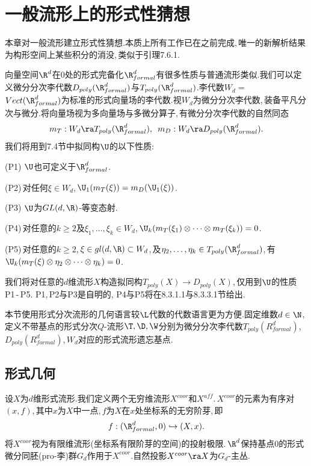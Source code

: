 \chapter{一般流形上的形式性猜想}

本章对一般流形建立形式性猜想.本质上所有工作已在之前完成,\,唯一的新解析结果为构形空间上某些积分的消没,\,类似于引理7.6.1.

向量空间$\R^d$在$0$处的形式完备化$\R^d_{formal}$有很多性质与普通流形类似.我们可以定义微分分次李代数$D_{poly}(\R^d_{formal})$与$T_{poly}(\R^d_{formal})$.李代数$W_d=$\\$Vect(\R^d_{formal})$为标准的形式向量场的李代数.视$W_d$为微分分次李代数,\,装备平凡分次与微分.将向量场视为多向量场与多微分算子,\,有微分分次李代数的自然同态
$$m_T: W_d\ra T_{poly}
               (\R^d_{formal}),\,\,\,m_D:W_d\ra D_{poly}
               (\R^d_{formal}).$$
我们将用到7.4节中拟同构$\U$的以下性质:\,

(P1)\,\,$\U$也可定义于$\R^d_{formal}$.

(P2)\,对任何$\xi\in W_d$,\,$\U_1(m_T(\xi))=m_D(\U_1(\xi))$.

(P3)\,\,$\U$为$GL(d,\R)$-等变态射.

(P4)\,对任意的$k\ge 2$及$\xi_1,\dots,\xi_k\in W_d$,\,$\U_k(m_T(\xi_1)\otimes\dots\otimes
            m_T(\xi_k))=0$.

(P5)\,对任意的$k\ge 2$,\,$\xi\in gl(d,\R)\subset W_d$,\,及$\eta_2,\dots,\eta_k\in T_{poly}
               (\R^d_{formal})$,\,有$\U_k(m_T(\xi)\otimes\eta_2
                \otimes\dots\otimes\eta_k)=0$.

我们将对任意的$d$维流形$X$构造拟同构$T_{poly}(X)\to D_{poly}(X)$,\,仅用到$\U$的性质P1\,-\,P5.\,\,P1,\,P2与P3是自明的,\,\,P4与P5将在8.3.1.1与8.3.3.1节给出.

本节使用形式分次流形的几何语言较$\L$代数的代数语言更为方便.固定维数$d\in \N$,\,定义不带基点的形式分次$Q$-流形$\T,\D,\W$分别为微分分次李代数$T_{poly}(R^d_{formal})$,\,$D_{poly}(R^d_{formal})$,\,$W_d$对应的形式流形遗忘基点.


\section{形式几何}
设$X$为$d$维形式流形.我们定义两个无穷维流形$X^{coor}$和$X^{aff}$.\,$X^{coor}$的元素为有序对$(x,f)$,\,其中$x$为$X$中一点,\,$f$为$X$在$x$处坐标系的无穷阶芽,\,即
$$f:(\R^d_{formal},0)\hookrightarrow (X,x).$$
将$X^{coor}$视为有限维流形(坐标系有限阶芽的空间)的投射极限.\,$\R^d$保持基点$0$的形式微分同胚(pro-李)群$G_d$作用于$X^{coor}$.自然投影$X^{coor}\ra X$为$G_d$-主丛.

